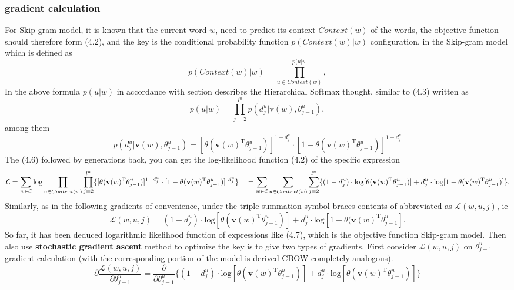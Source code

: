 \documentclass[12pt,a4paper,twoside]{book}
\begin{document}
\subsubsection {gradient calculation} 
For Skip-gram model, it is known that the current word $w$, need to predict its context $Context(w)$ of the words, the objective function should therefore form (4.2), and the key is the conditional probability function $p(Context(w)|w)$ configuration, in the Skip-gram model which is defined as
$$p(Context(w)|w)=\prod_{u\in Context(w)}^{p(u|w},$$
In the above formula $p(u|w)$ in accordance with section describes the Hierarchical Softmax thought, similar to (4.3) written as
$$p(u|w)=\prod_{j = 2}^{l^u}p(d^u_j|\text{v}(w),\theta^u_{j-1}), $$
among them
\begin{equation}
p(d^u_j|\mathbf{v}(w),\theta^u_{j-1})=[\theta(\mathbf{v}(w)^{\mathrm{T}}\theta^u_{j-1})]^{1-d^u_j}\cdot[1-\theta(\mathbf{v}(w)^{\mathrm{T}}\theta^u_{j-1})]^{1-d^u_j}
\end{equation}
The (4.6) followed by generations back, you can get the log-likelihood function (4.2) of the specific expression
\begin{equation}
\mathcal{L}=\sum_{w\in\mathcal{C}}\mathrm{log}\prod_{u\in Context(w)}\prod_{j=2}^{l^u}\{[\theta(\mathbf{v}(w)^{\mathrm{T}}\theta^u_{j-1})]^{1-d^u_j}\cdot[1-\theta(\mathbf{v}(w)^{\mathrm{T}}\theta^u_{j-1})]^{\ d^u_j}\} \\
\ \ \ =\sum_{w\in\mathcal{C}}\sum_{u\in Context(w)}\sum_{j=2}^{l^u}\{(1-d^u_j)\cdot\mathrm{log}[\theta(\mathbf{v}(w)^{\mathrm{T}}\theta^u_{j-1})]+d^u_j\cdot\mathrm{log}[1-\theta(\mathbf {v}(w)^{\mathrm{T}}\theta^u_{j-1})]\}.
\end{equation}
Similarly, as in the following gradients of convenience, under the triple summation symbol braces contents of abbreviated as $\mathcal{L}(w,u,j)$, ie
$$\mathcal{L}(w,u,j)=(1-d^u_j)\cdot\mathrm{log}[\theta(\mathbf{v}(w)^{\mathrm{T}}\theta^u_{j-1})]+d^u_j\cdot\mathrm{log}[1-\theta(\mathbf{v}(w)^{\mathrm{T}}\theta^u_{j-1}]. $$
So far, it has been deduced logarithmic likelihood function of expressions like (4.7), which is the objective function Skip-gram model. Then also use \textbf{stochastic gradient ascent} method to optimize the key is to give two types of gradients.
First consider $\mathcal{L}(w,u,j)$ on $\theta^u_{j-1}$ gradient calculation (with the corresponding portion of the model is derived CBOW completely analogous).
$$\partial\frac{\mathcal{L}(w, u, j)}{\partial\theta^u_{j-1}}=\frac{\partial}{\partial\theta^u_{j-1}}\{(1-d^u_j)\cdot\mathrm{log}[\theta(\mathbf{v}(w)^{\mathrm{T}}\theta^u_{j-1})]+d^u_j\cdot\mathrm{log}[\theta(\mathbf{v}(w)^{\mathrm{T}}\theta^u_{j-1})]\}$$
\end{document}
